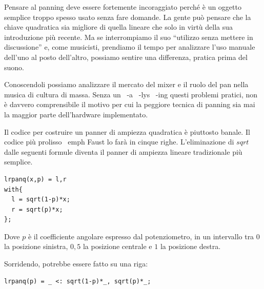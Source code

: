 Pensare al panning deve essere fortemente incoraggiato perché è un oggetto
semplice troppo spesso usato senza fare domande. La gente può pensare che la
chiave quadratica sia migliore di quella lineare che solo in virtù della sua
introduzione più recente. Ma se interrompiamo il suo “utilizzo senza mettere in
discussione” e, come musicisti, prendiamo il tempo per analizzare l'uso manuale
dell'uno al posto dell'altro, possiamo sentire una differenza, pratica prima del
suono.

Conoscendoli possiamo analizzare il mercato del mixer e il ruolo del pan nella
musica di cultura di massa. Senza un \ -a \ -lys \ -ing questi problemi pratici,
non è davvero comprensibile il motivo per cui la peggiore tecnica di panning sia
mai la maggior parte dell'hardware implementato.

Il codice per costruire un panner di ampiezza quadratica è piuttosto banale.
Il codice più prolisso \ emph {Faust} lo farà in cinque righe. L'eliminazione di
$sqrt$ dalle seguenti formule diventa il panner di ampiezza lineare tradizionale
più semplice.

\begin{lstlisting}
lrpanq(x,p) = l,r
with{
  l = sqrt(1-p)*x;
  r = sqrt(p)*x;
};
\end{lstlisting}

Dove $ p $ è il coefficiente angolare espresso dal potenziometro, in un
intervallo tra $ 0 $ la posizione sinistra, $ 0,5 $ la posizione centrale e $1$
la posizione destra.

Sorridendo, potrebbe essere fatto su una riga:

\begin{lstlisting}
lrpanq(p) = _ <: sqrt(1-p)*_, sqrt(p)*_;
\end{lstlisting}

